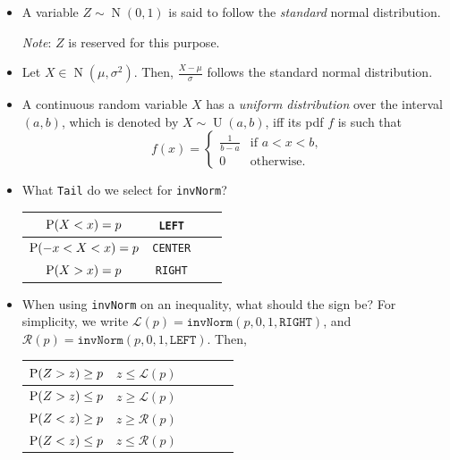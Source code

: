 \documentclass[../Notes.tex]{subfiles}
\begin{document}
\begin{stbox}{}
  \begin{itemize}
    \setcounter{enumi}{3}
    \item A variable \(Z\sim \operatorname{N}(0,1)\) is said to follow the \emph{standard} normal distribution.

    \emph{Note}: \(Z\) is reserved for this purpose.
    \item Let \(X \in \operatorname{N}(\mu,\sigma^2)\). Then, \(\frac{X-\mu}{\sigma}\) follows the standard normal distribution. 
    \item A continuous random variable \(X\) has a \emph{uniform distribution} over the interval \((a,b)\), which is denoted by \(X \sim \operatorname{U}(a,b)\), iff its pdf \(f\) is such that
    \[f(x)=\begin{cases}
      \frac{1}{b-a} &\text{if \(a<x<b\),}\\
      0 &\text{otherwise.}
    \end{cases}\] 
    \item What \texttt{Tail} do we select for \texttt{invNorm}?
    \begin{center}
      \begin{tabular}{|Sc|Sc|}
        \hline
        \(\operatorname{P}(X<x)=p\) & \texttt{LEFT}\\
        \hline
        \(\operatorname{P}(-x<X<x)=p\) & \texttt{CENTER}\\
        \hline
        \(\operatorname{P}(X>x)=p\) & \texttt{RIGHT}\\
        \hline
      \end{tabular}
    \end{center}
    \item When using \texttt{invNorm} on an inequality, what should the sign be? For simplicity, we write \(\mathscr{L}(p)=\texttt{invNorm}(p,0,1,\texttt{RIGHT})\), and \(\mathscr{R}(p)=\texttt{invNorm}(p,0,1,\texttt{LEFT})\). Then,
    \begin{center}
      \begin{tabular}{|Sc|Sc|Sc|}
        \hline
        \(\operatorname{P}(Z>z)\geq p\) & \(z\leq \mathscr{L}(p)\)\\
        \hline
        \(\operatorname{P}(Z>z)\leq p\) & \(z\geq \mathscr{L}(p)\)\\
        \hline
        \(\operatorname{P}(Z<z)\geq p\) & \(z\geq \mathscr{R}(p)\)\\
        \hline
        \(\operatorname{P}(Z<z)\leq p\) & \(z\leq \mathscr{R}(p)\)\\
        \hline
      \end{tabular}
    \end{center}
  \end{itemize}
\end{stbox}
\end{document}
